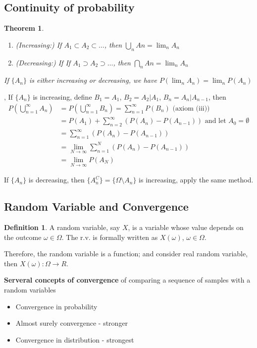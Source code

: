 \documentclass[11pt]{article}
\newtheorem{theorem}{Theorem}[section]
\theoremstyle{definition}
\newtheorem{definition}{Definition}[section]
\theoremstyle{remark}
\begin{document}
\subsection{Continuity of probability}
    \begin{theorem}
        \begin{enumerate}
            \item (Increasing:) If $A_1 \subset A_2 \subset \dots$, then $\bigcup_n An = \lim_n A_n$
            \item (Decreasing:) If If $A_1 \supset A_2 \supset \dots$, then $\bigcap_n An = \lim_n A_n$
        \end{enumerate}
        If $\{A_n\}$ is either increasing or decreasing, we have $P(\lim_n A_n) = \lim_n P(A_n)$
    \end{theorem}
    \proofname, 
    If $\{A_n\}$ is increasing, define $B_1=A_1$, $B_2=A_2|A_1$, $B_n=A_n|A_{n-1}$, then
    \begin{align*}
        P(\bigcup_{n=1}^\infty A_n) &= P(\bigcup_{n=1}^\infty B_n) = \sum_{n=1}^\infty P( B_n) \text{ (axiom (iii))}\\
        &= P(A_1) + \sum_{n=2}^\infty (P(A_n) - P(A_{n-1})) \text{ and let $A_0 = \emptyset$} \\
        &= \sum_{n=1}^\infty (P(A_n) - P(A_{n-1})) \\
        &= \lim_{N\to\infty}  \sum_{n=1}^N (P(A_n) - P(A_{n-1})) \\
        &= \lim_{N\to\infty} P(A_N)
    \end{align*}
    
    If $\{A_n\}$ is decreasing, then $\{A_n^C\} =  \{\Omega \setminus A_n\}$ is increasing, apply the same method.

\subsection{Random Variable and Convergence}
    \begin{definition}
        A random variable, say $X$, is a variable whose value depends on the outcome $\omega \in \Omega$. The r.v. is formally written as $X(\omega)$, $\omega \in \Omega$. 
    
        Therefore, the random variable is a function; and consider real random variable, then $X(\omega): \Omega \rightarrow R$.
    \end{definition}
    \textbf{Serveral concepts of convergence} of comparing a sequence of samples with a random variables 
    \begin{itemize}
        \item Convergence in probability
        \item Almost surely convergence - stronger
        \item Convergence in distribution - strongest
    \end{itemize}
    
\end{document}
